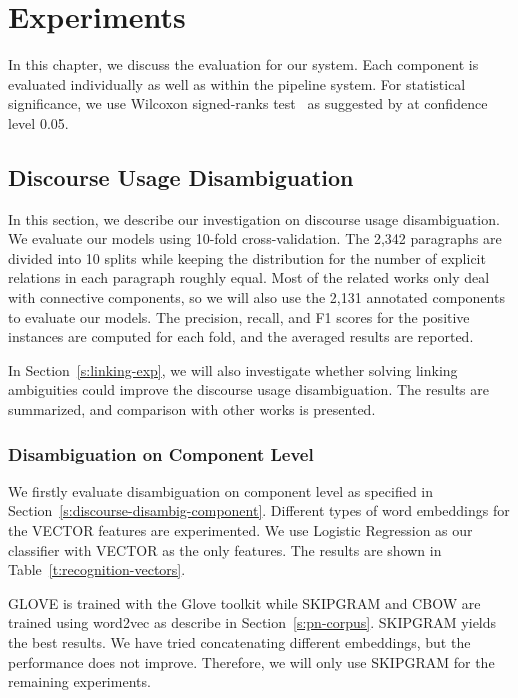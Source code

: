 %
%
%
\chapter{Experiments}
\label{c:exp}

In this chapter, we discuss the evaluation for our system. Each component
is evaluated individually as well as within the pipeline system. For
statistical significance, we use Wilcoxon signed-ranks test~\citep{wilcoxon1945individual}
as suggested by \cite{demvsar2006statistical} at confidence level 0.05.

\section{Discourse Usage Disambiguation}
\label{s:discourse-usage-exp}

In this section, we describe our investigation
on discourse usage disambiguation. We evaluate our models using
10-fold cross-validation. The 2,342 paragraphs are divided  into 10 splits
while keeping the distribution for the number of explicit relations
in each paragraph roughly equal. Most of the related works only
deal with connective components, so we will also use the 2,131 annotated
components to evaluate our models.
The precision, recall, and F1 scores for the positive instances are computed
for each fold, and the averaged results are reported.

In Section~\ref{s:linking-exp}, we will also investigate whether solving linking
ambiguities could improve the discourse usage disambiguation. The results
are summarized, and comparison with other works is presented.


\subsection{Disambiguation on Component Level}

We firstly evaluate disambiguation on component level as specified in
Section~\ref{s:discourse-disambig-component}.  
Different types of word embeddings for
the VECTOR features are experimented. We use Logistic Regression
as our classifier with VECTOR as the only features. The results are
shown in Table~\ref{t:recognition-vectors}. 



GLOVE is trained with the Glove toolkit while SKIPGRAM and CBOW are trained
using word2vec as describe in Section~\ref{s:pn-corpus}. SKIPGRAM yields
the best results. We have tried concatenating different embeddings,
but the performance does not improve. Therefore, we will only use SKIPGRAM
for the remaining experiments.

